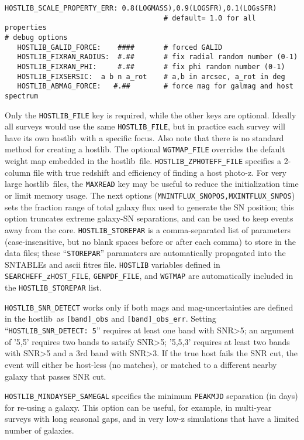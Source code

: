 \documentclass[12pt]{article}
\newcommand{\hostlib}{{\sc hostlib}}
\begin{document}
{\begin{Verbatim}[frame=single]
   HOSTLIB_SCALE_PROPERTY_ERR: 0.8(LOGMASS),0.9(LOGSFR),0.1(LOGsSFR)   
                                      # default= 1.0 for all properties
# debug options
   HOSTLIB_GALID_FORCE:    ####       # forced GALID 
   HOSTLIB_FIXRAN_RADIUS:  #.##       # fix radial random number (0-1)
   HOSTLIB_FIXRAN_PHI:     #.##       # fix phi random number (0-1)
   HOSTLIB_FIXSERSIC:  a b n a_rot    # a,b in arcsec, a_rot in deg
   HOSTLIB_ABMAG_FORCE:   #.##        # force mag for galmag and host spectrum
\end{Verbatim}
Only the {\tt HOSTLIB\_FILE} key is required, while the
other keys are optional. Ideally all surveys would use
the same {\tt HOSTLIB\_FILE}, but in practice each survey
will have its own \hostlib\ with a specific focus.
Also note that there is no standard method for creating 
a \hostlib. The optional {\tt WGTMAP\_FILE} overrides the 
default weight map embedded in the
\hostlib\ file. 
{\tt HOSTLIB\_ZPHOTEFF\_FILE} specifies a 2-column file with
true redshift and efficiency of finding a host photo-z.
For very large \hostlib\ files,
the {\tt MAXREAD} key may be useful to reduce the 
initialization time or limit memory usage.
The next options ({\tt MNINTFLUX\_SNOPOS,MXINTFLUX\_SNPOS}) sets the
fraction range of total galaxy flux used to generate the
SN position; this option truncates extreme galaxy-SN
separations, and can be used to keep events away from the core.
{\tt HOSTLIB\_STOREPAR} is a comma-separated
list of parameters (case-insensitive, but no blank spaces
before or after each comma) to store in the data files;
these ``{\tt STOREPAR}'' paramaters are automatically propagated 
into the SNTABLEs  and ascii fitres file.
{\tt HOSTLIB} variables defined in 
{\tt SEARCHEFF\_zHOST\_FILE},
{\tt GENPDF\_FILE}, and
{\tt WGTMAP}
are automatically included in the {\tt HOSTLIB\_STOREPAR} list.


{\tt HOSTLIB\_SNR\_DETECT} works only if both mags and mag-uncertainties
are defined in the \hostlib\ as {\tt [band]\_obs} and {\tt [band]\_obs\_err}.
Setting ``{\tt HOSTLIB\_SNR\_DETECT: 5}'' requires at least one band with
SNR>5; an argument of '5,5' requires two bands to satsify SNR>5;
'5,5,3' requires at least two bands with SNR>5 and a 3rd band with SNR>3.
If the true host fails the SNR cut, the event will either be host-less
(no matches), or matched to a different nearby galaxy that
passes SNR cut.

{\tt HOSTLIB\_MINDAYSEP\_SAMEGAL} specifies the minimum
{\tt PEAKMJD} separation (in days) for re-using a galaxy.
This option can be useful, for example, in multi-year surveys 
with long seasonal gaps, and in very low-z simulations that have 
a limited number of galaxies.


}
\end{document}
